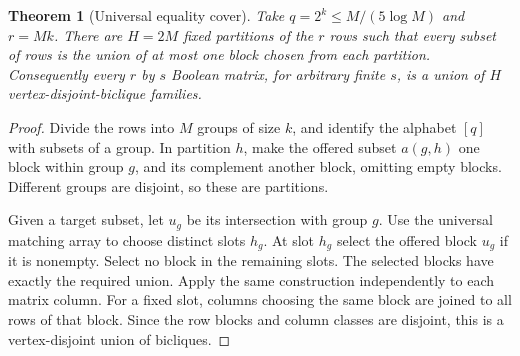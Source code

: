 \documentclass[11pt]{article}
\newtheorem{theorem}{Theorem}
\begin{document}
\begin{theorem}[Universal equality cover]
Take $q=2^k\leq M/(5\log M)$ and $r=Mk$. There are $H=2M$
fixed partitions of the $r$ rows such that every subset of rows is
the union of at most one block chosen from each partition.
Consequently every $r$ by $s$ Boolean matrix, for arbitrary finite
$s$, is a union of $H$ vertex-disjoint-biclique families.
\end{theorem}
\begin{proof}
Divide the rows into $M$ groups of size $k$, and identify the alphabet
$[q]$ with subsets of a group. In partition $h$, make the offered
subset $a(g,h)$ one block within group $g$, and its complement another
block, omitting empty blocks. Different groups are disjoint, so these
are partitions.

Given a target subset, let $u_g$ be its intersection with group $g$.
Use the universal matching array to choose distinct slots $h_g$.
At slot $h_g$ select the offered block $u_g$ if it is nonempty.
Select no block in the remaining slots. The selected blocks have
exactly the required union. Apply the same construction independently
to each matrix column. For a fixed slot, columns choosing the same
block are joined to all rows of that block. Since the row blocks
and column classes are disjoint, this is a vertex-disjoint union
of bicliques.
\end{proof}
\end{document}
